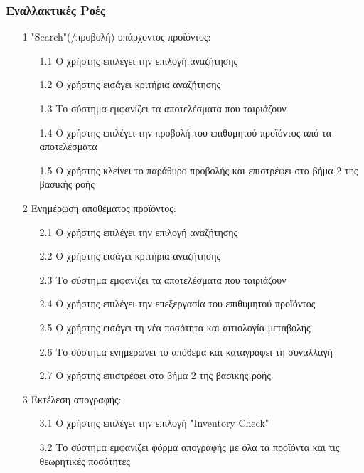 \documentclass[12pt,a4paper,twoside]{book}
\begin{document}
\subsubsection{Εναλλακτικές Ροές}
\begin{enumerate}
  \item[1 ] "Search"(/προβολή) υπάρχοντος προϊόντος:
        \begin{enumerate}
          \item[1.1 ] Ο χρήστης επιλέγει την επιλογή αναζήτησης
          \item[1.2 ] Ο χρήστης εισάγει κριτήρια αναζήτησης %
          \item[1.3 ] Το σύστημα εμφανίζει τα αποτελέσματα που ταιριάζουν
          \item[1.4 ] Ο χρήστης επιλέγει την προβολή του επιθυμητού προϊόντος από τα αποτελέσματα
          \item[1.5 ] Ο χρήστης κλείνει το παράθυρο προβολής και επιστρέφει στο βήμα 2 της βασικής ροής
        \end{enumerate}
  \item[2 ] Ενημέρωση αποθέματος προϊόντος:
        \begin{enumerate}
          \item [2.1 ] Ο χρήστης επιλέγει την επιλογή αναζήτησης
          \item [2.2 ] Ο χρήστης εισάγει κριτήρια αναζήτησης %
          \item [2.3 ] Το σύστημα εμφανίζει τα αποτελέσματα που ταιριάζουν
          \item [2.4 ] Ο χρήστης επιλέγει την επεξεργασία του επιθυμητού προϊόντος
          \item [2.5 ] Ο χρήστης εισάγει τη νέα ποσότητα και αιτιολογία μεταβολής %
          \item [2.6 ] Το σύστημα ενημερώνει το απόθεμα και καταγράφει τη συναλλαγή
          \item [2.7 ] Ο χρήστης επιστρέφει στο βήμα 2 της βασικής ροής
        \end{enumerate}
  \item[3 ] Εκτέλεση απογραφής:
        \begin{enumerate}
          \item [3.1 ] Ο χρήστης επιλέγει την επιλογή "Inventory Check"
          \item [3.2 ] Το σύστημα εμφανίζει φόρμα απογραφής με όλα τα προϊόντα και τις θεωρητικές ποσότητες

\end{enumerate}
\end{enumerate}
\end{document}
